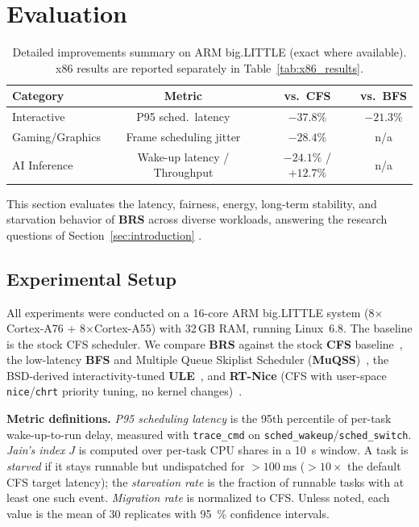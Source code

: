 \section{Evaluation}

\begin{table}[t]
\centering
\caption{Detailed improvements summary on ARM big.LITTLE (exact where available). x86 results are reported separately in Table~\ref{tab:x86_results}.}
\label{tab:improve}
\begin{tabular}{lccc}
\toprule
Category & Metric & vs.\ CFS & vs.\ BFS \\
\midrule
Interactive & P95 sched.\ latency & $-37.8\%$ & $-21.3\%$ \\
Gaming/Graphics & Frame scheduling jitter & $-28.4\%$ & n/a \\
AI Inference & Wake-up latency / Throughput & $-24.1\%$ / $+12.7\%$ & n/a \\
\bottomrule
\end{tabular}
\end{table}

\label{sec:evaluation}

This section evaluates the latency, fairness, energy, long-term stability, and starvation behavior of \textbf{BRS} across diverse workloads, answering the research questions of Section~\ref{sec:introduction} \cite{10306992,Bouron2018Battle}.

\subsection{Experimental Setup}
\label{subsec:exp-setup}

All experiments were conducted on a 16-core ARM big.LITTLE system (8$\times$Cortex-A76 + 8$\times$Cortex-A55) with 32\,GB RAM, running Linux~6.8. The baseline is the stock CFS scheduler. We compare \textbf{BRS} against the stock \textbf{CFS} baseline~\cite{Bouron2018Battle}, the low-latency \textbf{BFS} and Multiple Queue Skiplist Scheduler (\textbf{MuQSS})~\cite{10306992}, the BSD-derived interactivity-tuned \textbf{ULE}~\cite{8762113}, and \textbf{RT-Nice} (CFS with user-space \texttt{nice}/\texttt{chrt} priority tuning, no kernel changes)~\cite{8762113}.

\textbf{Metric definitions.} \emph{P95 scheduling latency} is the 95th percentile of per-task wake-up-to-run delay, measured with \texttt{trace\_cmd} on \texttt{sched\_wakeup}/\texttt{sched\_switch}. \emph{Jain's index} $J$ is computed over per-task CPU shares in a \SI{10}{\second} window. A task is \emph{starved} if it stays runnable but undispatched for $>\SI{100}{\milli\second}$ ($>10\times$ the default CFS target latency); the \emph{starvation rate} is the fraction of runnable tasks with at least one such event. \emph{Migration rate} is normalized to CFS. Unless noted, each value is the mean of \num{30} replicates with \SI{95}{\percent} confidence intervals.

